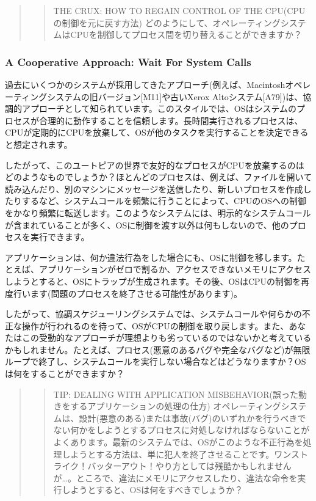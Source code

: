 \begin{quote}
\begin{quote}
THE CRUX: HOW TO REGAIN CONTROL OF THE CPU(CPUの制御を元に戻す方法)
どのようにして、オペレーティングシステムはCPUを制御してプロセス間を切り替えることができますか？
\end{quote}
\end{quote}

\hypertarget{a-cooperative-approach-wait-for-system-calls}{%
\subsubsection*{A Cooperative Approach: Wait For System
Calls}\label{a-cooperative-approach-wait-for-system-calls}}

過去にいくつかのシステムが採用してきたアプローチ(例えば、Macintoshオペレーティングシステムの旧バージョン{[}M11{]}や古いXerox
Altoシステム{[}A79{]})は、協調的アプローチとして知られています。このスタイルでは、OSはシステムのプロセスが合理的に動作することを信頼します。長時間実行されるプロセスは、CPUが定期的にCPUを放棄して、OSが他のタスクを実行することを決定できると想定されます。

したがって、このユートピアの世界で友好的なプロセスがCPUを放棄するのはどのようなものでしょうか？ほとんどのプロセスは、例えば、ファイルを開いて読み込んだり、別のマシンにメッセージを送信したり、新しいプロセスを作成したりするなど、システムコールを頻繁に行うことによって、CPUのOSへの制御をかなり頻繁に転送します。このようなシステムには、明示的なシステムコールが含まれていることが多く、OSに制御を渡す以外は何もしないので、他のプロセスを実行できます。

アプリケーションは、何か違法行為をした場合にも、OSに制御を移します。たとえば、アプリケーションがゼロで割るか、アクセスできないメモリにアクセスしようとすると、OSにトラップが生成されます。その後、OSはCPUの制御を再度行います(問題のプロセスを終了させる可能性があります)。

したがって、協調スケジューリングシステムでは、システムコールや何らかの不正な操作が行われるのを待って、OSがCPUの制御を取り戻します。また、あなたはこの受動的なアプローチが理想よりも劣っているのではないかと考えているかもしれません。たとえば、プロセス(悪意のあるバグや完全なバグなど)が無限ループで終了し、システムコールを実行しない場合などはどうなりますか？OSは何をすることができますか？

\begin{quote}
\begin{quote}
TIP: DEALING WITH APPLICATION
MISBEHAVIOR(誤った動きをするアプリケーションの処理の仕方)
オペレーティングシステムは、設計(悪意のある)または事故(バグ)のいずれかを行うべきでない何かをしようとするプロセスに対処しなければならないことがよくあります。最新のシステムでは、OSがこのような不正行為を処理しようとする方法は、単に犯人を終了させることです。ワンストライク！バッターアウト！やり方としては残酷かもしれませんが\ldots。ところで、違法にメモリにアクセスしたり、違法な命令を実行しようとすると、OSは何をすべきでしょうか？
\end{quote}
\end{quote}


